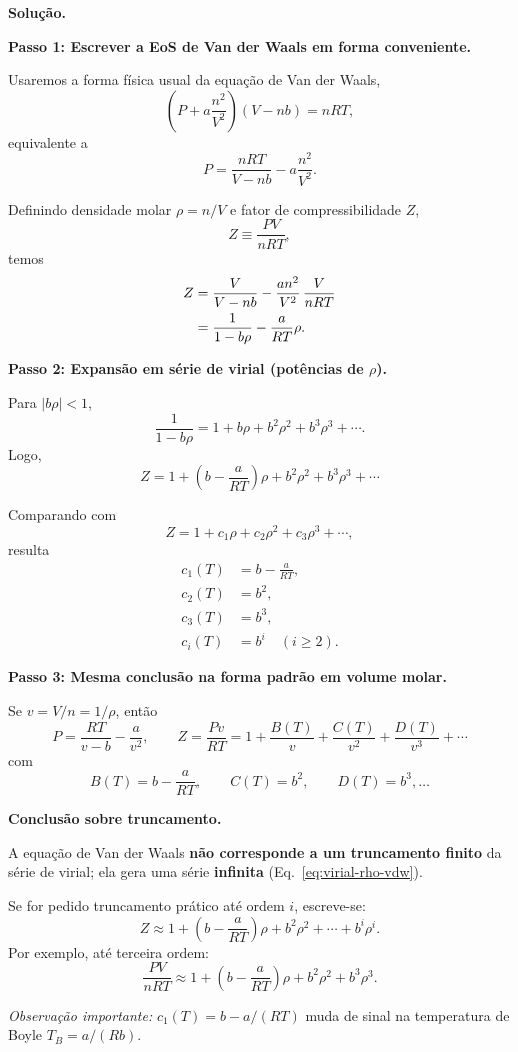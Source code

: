 \documentclass[12pt,a4paper]{article}
\theoremstyle{definition}
\newenvironment{solucao}{%
  \par\medskip\noindent\textbf{Solu\c{c}\~ao.}\quad\ignorespaces
}{%
  \par\medskip
}
\begin{document}
\begin{solucao}

\noindent\textbf{Passo 1: Escrever a EoS de Van der Waals em forma conveniente.}

Usaremos a forma f\'isica usual da equa\c{c}\~ao de Van der Waals,
\[
\left(P + a\frac{n^2}{V^2}\right)(V-nb)=nRT,
\]
equivalente a
\[
P=\frac{nRT}{V-nb}-a\frac{n^2}{V^2}.
\]

Definindo densidade molar $\rho=n/V$ e fator de compressibilidade $Z$,
\[
Z\equiv\frac{PV}{nRT},
\]
temos
\begin{align}
Z &= \frac{V}{V-nb} - \frac{a n^2}{V^2}\,\frac{V}{nRT} \notag \\
  &= \frac{1}{1-b\rho} - \frac{a}{RT}\rho.
\end{align}

\medskip
\noindent\textbf{Passo 2: Expans\~ao em s\'erie de virial (pot\^encias de $\rho$).}

Para $|b\rho|<1$,
\[
\frac{1}{1-b\rho}=1+b\rho+b^2\rho^2+b^3\rho^3+\cdots.
\]
Logo,
\begin{equation}
Z=1+\left(b-\frac{a}{RT}\right)\rho+b^2\rho^2+b^3\rho^3+\cdots
\label{eq:virial-rho-vdw}
\end{equation}

Comparando com
\[
Z=1+c_1\rho+c_2\rho^2+c_3\rho^3+\cdots,
\]
resulta
\begin{align}
c_1(T) &= b-\frac{a}{RT}, \\
c_2(T) &= b^2, \\
c_3(T) &= b^3, \\
c_i(T) &= b^i \quad (i\ge 2).
\end{align}

\medskip
\noindent\textbf{Passo 3: Mesma conclus\~ao na forma padr\~ao em volume molar.}

Se $v=V/n=1/\rho$, ent\~ao
\[
P=\frac{RT}{v-b}-\frac{a}{v^2},
\qquad
Z=\frac{Pv}{RT}=1+\frac{B(T)}{v}+\frac{C(T)}{v^2}+\frac{D(T)}{v^3}+\cdots
\]
com
\[
B(T)=b-\frac{a}{RT},\qquad C(T)=b^2,\qquad D(T)=b^3,\ldots
\]

\medskip
\noindent\textbf{Conclus\~ao sobre truncamento.}

A equa\c{c}\~ao de Van der Waals \textbf{n\~ao corresponde a um truncamento finito} da s\'erie de virial; ela gera uma s\'erie \textbf{infinita} (Eq.~\eqref{eq:virial-rho-vdw}).

Se for pedido truncamento pr\'atico at\'e ordem $i$, escreve-se:
\[
Z\approx 1+\left(b-\frac{a}{RT}\right)\rho+b^2\rho^2+\cdots+b^i\rho^i.
\]
Por exemplo, at\'e terceira ordem:
\begin{equation}
\boxed{\frac{PV}{nRT}\approx 1+\left(b-\frac{a}{RT}\right)\rho+b^2\rho^2+b^3\rho^3.}
\end{equation}

\medskip
\textit{Observa\c{c}\~ao importante:} $c_1(T)=b-a/(RT)$ muda de sinal na temperatura de Boyle $T_B=a/(Rb)$.

\end{solucao}
\end{document}
